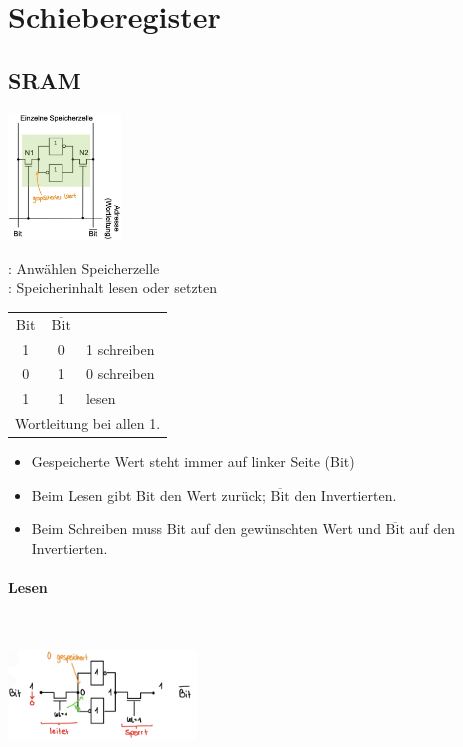\section{Schieberegister}
\subsection{SRAM}
\begin{center}
    \begin{minipage}{0.45\linewidth}
        \includegraphics[width = 30mm]{images/sram_store.JPG}
    \end{minipage}
    \hfill
    \begin{minipage}{0.5\linewidth}
        : Anwählen Speicherzelle\\
        : Speicherinhalt lesen oder setzten
        \begin{center}
            \begin{tabular}{c c l}
                Bit & $\overline{\text{Bit}}$ & \\
                1 & 0 & 1 schreiben\\
                0 & 1 & 0 schreiben\\
                1 & 1 & lesen\\
                \multicolumn{3}{l}{Wortleitung bei allen 1.}
            \end{tabular}
        \end{center}
    \end{minipage}
\end{center}
\begin{itemize}
    \item Gespeicherte Wert steht immer auf linker Seite (Bit)
    \item Beim Lesen gibt Bit den Wert zurück; $\overline{\text{Bit}}$ den Invertierten.
    \item Beim Schreiben muss Bit auf den gewünschten Wert und $\overline{\text{Bit}}$ auf den Invertierten.
\end{itemize}
\paragraph{Lesen}\mbox{}\\
\begin{center}
    \includegraphics[width = 50mm]{images/sram_read.JPG}
\end{center}
